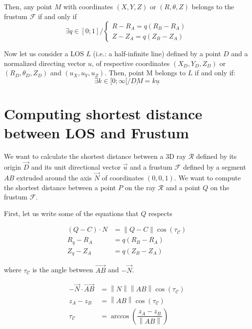 \documentclass[a4paper,11pt,twoside,titlepage,openright]{book}
\numberwithin{equation}{section}
\newcommand{\ud}[1]{\underline{#1}}
\newcommand{\norm}[1]{\left\lVert#1\right\rVert}
\begin{document}
Then, any point $M$ with coordinates $(X,Y,Z)$ or $(R,\theta,Z)$ belongs to the frustum $\mathcal{F}$ if and only if
$$
\exists q \in [0;1] /
\left\{ \begin{array}{ll}
R-R_A = q(R_B-R_A)\\
Z-Z_A = q(Z_B-Z_A)
\end{array}\right.
$$


Now let us consider a LOS $L$ (i.e.: a half-infinite line) defined by a point $D$ and a normalized directing vector $u$, of respective coordinates $(X_D,Y_D,Z_D)$ or $(R_D,\theta_D,Z_D)$ and $(u_X,u_Y,u_Z)$.
Then, point M belongs to $L$ if and only if:
$$
\exists k \in [0;\infty[ / \ud{DM} = k\ud{u}
$$



\chapter{Computing shortest distance between LOS and Frustum}


We want to calculate the shortest distance between a 3D ray $\mathcal{R}$ defined by its origin $\vec{D}$ and its unit directional vector $\vec{u}$ and a frustum $\mathcal{F}$ defined by a segment $AB$ extruded around the axis $\vec{N}$ of coordinates $(0,0,1)$.
We want to compute the shortest distance between a point $P$ on the ray $\mathcal{R}$ and a point $Q$ on the frustum $\mathcal{F}$.


\begin{figure}[h]
\end{figure}


First, let us write some of the equations that $Q$ respects

\begin{align*}
(Q-C) \cdot N &= \norm{Q-C} \cos(\tau_\mathcal{C})\\
R_q-R_A &= q(R_B-R_A)\\
Z_q-Z_A &= q(Z_B-Z_A)
\end{align*}

where $\tau_\mathcal{C}$ is the angle between $\vec{AB}$ and $-\vec{N}$. 

\begin{align*}
-\vec{N}\cdot\vec{AB} & = \norm{N} \norm{AB} \cos(\tau_\mathcal{C})\\
z_A - z_B &= \norm{AB} \cos(\tau_\mathcal{C})\\
\tau_\mathcal{C} &= \arccos\left(\dfrac{z_A - z_B}{\norm{AB}}\right)
\end{align*}
\end{document}
